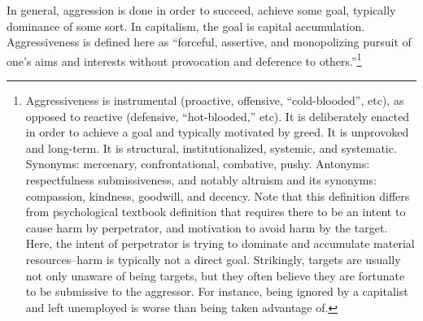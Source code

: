 \documentclass[11pt, letterpaper]{article}
\begin{document}
\begin{spacing}{2.0}
In general, aggression is done in order to succeed, achieve some goal,
typically dominance of some sort. In capitalism, the goal is capital accumulation. %
 Aggressiveness is defined here as ``forceful, assertive, and monopolizing
pursuit of one's aims and interests without provocation and deference to
others.''\footnote{
Aggressiveness is instrumental (proactive, offensive, ``cold-blooded'', etc), as
opposed to reactive (defensive, ``hot-blooded,'' etc). It is deliberately enacted
in order to achieve a goal and typically motivated by greed. It is unprovoked and long-term. It is structural, institutionalized, systemic, and systematic. %
%
Synonyms: mercenary, confrontational, combative,
pushy.
%
Antonyms: respectfulness %
submissiveness, and notably altruism and its synonyms: 
compassion, kindness, goodwill, and decency.
Note that this definition differs from psychological textbook definition
\citep[e.g.,][]{anderson02,stangor14} that requires
  there to be an intent to cause harm by perpetrator,
and motivation to avoid harm by the target. Here, the intent of perpetrator is
 trying to dominate and accumulate material resources--harm is typically not
a direct goal. Strikingly, targets are usually not only unaware of being
targets, but they often believe they are fortunate to be submissive to the
aggressor. For instance,  being ignored by a capitalist and left unemployed is worse than being taken advantage of.  
}
\end{spacing}
\end{document}
